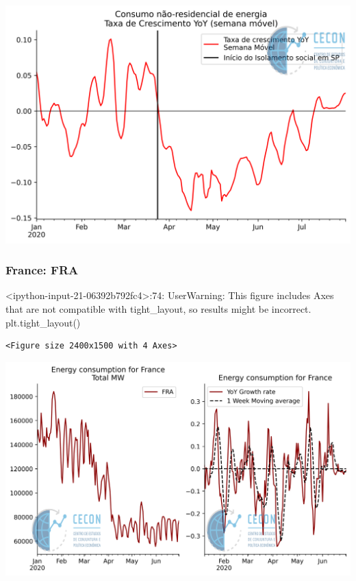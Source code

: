 \documentclass[11pt]{article}
\begin{document}
\begin{enumerate}
\begin{center}
\includegraphics[width=.9\linewidth]{obipy-resources/62e383af79e91b63c7fc98dd7fb55b3c3ececcb9/862628f923a3fda24d4e664ce8bc872a805019fe.png}
\end{center}
\end{enumerate}




\subsubsection{France: FRA}
\label{sec:orge88c274}

<ipython-input-21-06392b792fc4>:74: UserWarning: This figure includes Axes that are not compatible with tight\_layout, so results might be incorrect.
  plt.tight\_layout()

\begin{verbatim}
<Figure size 2400x1500 with 4 Axes>
\end{verbatim}


\begin{center}
\includegraphics[width=.9\linewidth]{obipy-resources/62e383af79e91b63c7fc98dd7fb55b3c3ececcb9/325746abff053090d5f6fe9490ccdb4ba397472d.png}
\end{center}
\end{document}
